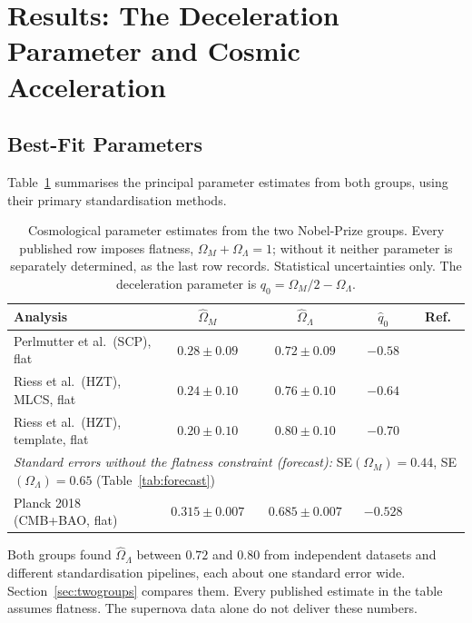 \documentclass[12pt]{article}
\begin{document}
\section{Results: The Deceleration Parameter and Cosmic Acceleration}
\label{sec:results}

\subsection{Best-Fit Parameters}

Table~\ref{tab:results} summarises the principal parameter estimates from
both groups, using their primary standardisation methods.

\begin{table}[ht]
\centering
\caption{Cosmological parameter estimates from the two Nobel-Prize groups.
Every published row imposes flatness, $\Omega_M + \Omega_\Lambda = 1$;
without it neither parameter is separately determined, as the last row
records.  Statistical uncertainties only.  The deceleration parameter is
$q_0 = \Omega_M/2 - \Omega_\Lambda$.}
\label{tab:results}
\medskip
\begin{tabular}{p{4.2cm}cccr}
\toprule
Analysis & $\hat\Omega_M$ & $\hat\Omega_\Lambda$ & $\hat q_0$ &
  Ref.\ \\
\midrule
Perlmutter et al.\ (SCP), flat   & $0.28\pm0.09$ & $0.72\pm0.09$
  & $-0.58$ & \citet{Perlmutter1999} \\
Riess et al.\ (HZT), MLCS, flat  & $0.24\pm0.10$ & $0.76\pm0.10$
  & $-0.64$ & \citet{Riess1998} \\
Riess et al.\ (HZT), template, flat & $0.20\pm0.10$ & $0.80\pm0.10$
  & $-0.70$ & \citet{Riess1998} \\
\midrule
\multicolumn{5}{l}{\emph{Standard errors without the flatness constraint
  (forecast):} SE$(\Omega_M)=0.44$, SE$(\Omega_\Lambda)=0.65$
  (Table~\ref{tab:forecast})} \\
\midrule
Planck 2018 (CMB+BAO, flat)      & $0.315\pm0.007$ & $0.685\pm0.007$
  & $-0.528$ & \citet{Planck2020} \\
\bottomrule
\end{tabular}
\end{table}

Both groups found $\hat\Omega_\Lambda$ between $0.72$ and $0.80$ from
independent datasets and different standardisation pipelines, each about one
standard error wide.  Section~\ref{sec:twogroups} compares them.  Every
published estimate in the table assumes flatness.  The supernova data alone do
not deliver these numbers.
\end{document}
